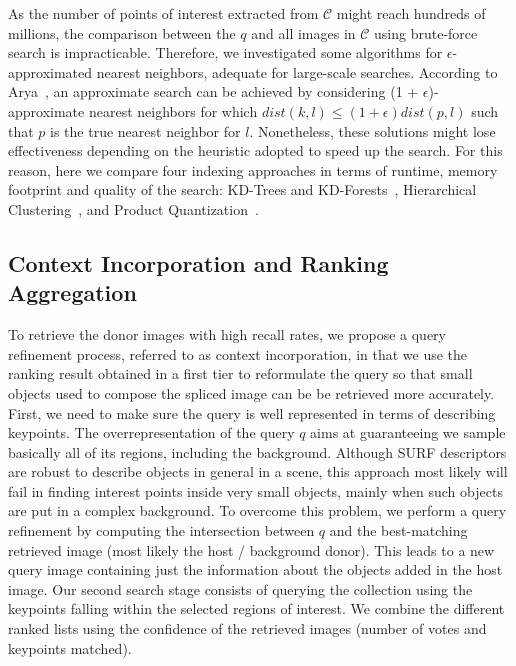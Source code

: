 As the number of points of interest extracted from $\mathcal{C}$ might reach hundreds of millions, the comparison between the $q$ and all images in $\mathcal{C}$ using brute-force search is impracticable. Therefore, we investigated some algorithms for $\epsilon$-approximated nearest neighbors, adequate for large-scale searches. According to Arya~\cite{Arya_1998}, an approximate search can be achieved by considering (1 + $\epsilon$)-approximate nearest neighbors for which $dist(k,l) \leq (1+\epsilon)dist(p,l)$ such that $p$ is the true nearest neighbor for $l$. Nonetheless, these solutions might lose effectiveness depending on the heuristic adopted to speed up the search. For this reason, here we compare four indexing approaches in terms of runtime, memory footprint and quality of the search: KD-Trees and KD-Forests~\cite{Bentley:COMMUN:1975}, Hierarchical Clustering~\cite{Steinbach:KDD:2000}, and Product Quantization~\cite{Jegou:TPAMI:2011}. 

\subsection{Context Incorporation and Ranking Aggregation}
To retrieve the donor images with high recall rates, we propose a query refinement process, referred to as context incorporation, in that we use the ranking result obtained in a first tier to reformulate the query so that small objects used to compose the spliced image can be be retrieved more accurately. First, we need to make sure the query is well represented in terms of describing keypoints. The overrepresentation of the query $q$ aims at guaranteeing we sample basically all of its regions, including the background. Although SURF descriptors are robust to describe objects in general in a scene, this approach most likely will fail in finding interest points inside very small objects, mainly when such objects are put in a complex background. To overcome this problem, we perform a query refinement by computing the intersection between $q$ and the best-matching retrieved image (most likely the host / background donor). This leads to a new query image containing just the information about the objects added in the host image. Our second search stage consists of querying the collection using the keypoints falling within the selected regions of interest. We combine the different ranked lists using the confidence of the retrieved images (number of votes and keypoints matched).%

